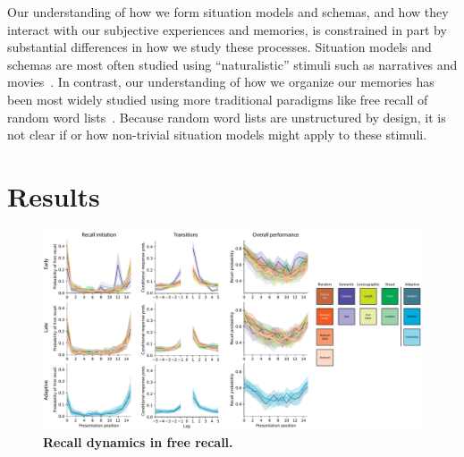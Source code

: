 \documentclass[10pt]{article}
\begin{document}

Our understanding of how we form situation models and schemas, and how they
interact with our subjective experiences and memories, is constrained in
part by substantial differences in how we study these processes.  Situation models
and schemas are most often studied using ``naturalistic'' 
stimuli such as narratives and movies~\citep{ZwaaEtal95,ZwaaRadv98, NastEtal20}.  In contrast, our
understanding of how we organize our memories has been most widely studied
using more traditional paradigms like free recall of random word lists~\citep{Kaha12}.
Because random word lists are unstructured by design, it is not clear if or how non-trivial
situation models might apply to these stimuli.



\section*{Results}

\begin{figure}[tp]
    \centering
    \includegraphics[width=\textwidth]{figures/recall_dynamics}
    \caption{\textbf{Recall dynamics in free recall.}}
    \label{fig:recall-dynamics}
\end{figure}


\end{document}
